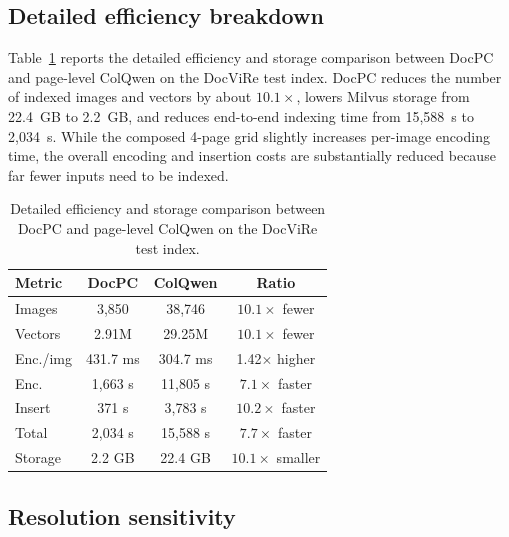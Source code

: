
\subsection{Detailed efficiency breakdown}
\label{sec:app-a4-efficiency}

Table~\ref{tab:app-efficiency-footprint} reports the detailed efficiency and storage comparison between DocPC and page-level ColQwen on the DocViRe test index.
DocPC reduces the number of indexed images and vectors by about $10.1\times$, lowers Milvus storage from 22.4~GB to 2.2~GB, and reduces end-to-end indexing time from 15{,}588~s to 2{,}034~s.
While the composed 4-page grid slightly increases per-image encoding time, the overall encoding and insertion costs are substantially reduced because far fewer inputs need to be indexed.

\begin{table}[htbp]
  \centering
  \footnotesize
  \setlength{\tabcolsep}{4pt}
  \caption{Detailed efficiency and storage comparison between DocPC and page-level ColQwen on the DocViRe test index.}
  \label{tab:app-efficiency-footprint}
  \begin{tabular}{@{}lccc@{}}
    \toprule
    Metric & DocPC & ColQwen & Ratio \\
    \midrule
    Images   & 3{,}850   & 38{,}746 & $10.1\times$ fewer \\
    Vectors  & 2.91M     & 29.25M   & $10.1\times$ fewer \\
    Enc./img & 431.7 ms  & 304.7 ms & 1.42$\times$ higher \\
    Enc.     & 1{,}663 s & 11{,}805 s & $7.1\times$ faster \\
    Insert   & 371 s     & 3{,}783 s & $10.2\times$ faster \\
    Total    & 2{,}034 s & 15{,}588 s & $7.7\times$ faster \\
    Storage  & 2.2 GB    & 22.4 GB  & $10.1\times$ smaller \\
    \bottomrule
  \end{tabular}
\end{table}

\subsection{Resolution sensitivity}
\label{sec:app-a4-resolution}

